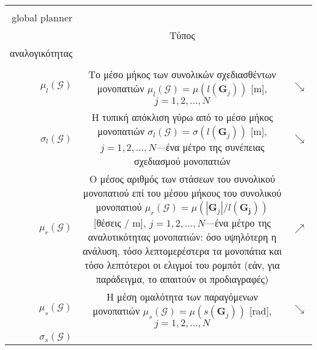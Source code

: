 \begin{table}[h]\hspace{-2.5cm}
  \renewcommand{\arraystretch}{1.8}
  \begin{tabular}{rcc}
    \begin{minipage} [t]{0.25\columnwidth}Μετρική αξιολόγησης \\ global planner \\ \end{minipage} & Τύπος & \begin{minipage} [t]{0.2\columnwidth}Τύπος \\ αναλογικότητας \\ \end{minipage} \\ \toprule
    $\mu_{l}(\bm{\mathcal{G}})$ &
    \begin{minipage}[t]{0.7\columnwidth}%
      Το μέσο μήκος των συνολικών σχεδιασθέντων μονοπατιών
      $\mu_l(\bm{\mathcal{G}}) = \mu(l(\bm{G}_j))$ [m], $j = 1,2,\dots,N$
    \end{minipage} & $\searrow$ \\
    $\sigma_{l}(\bm{\mathcal{G}})$ &
    \begin{minipage}[t]{0.7\columnwidth}%
      Η τυπική απόκλιση γύρω από το μέσο μήκος μονοπατιών
      $\sigma_l(\bm{\mathcal{G}}) = \sigma(l(\bm{G}_j))$ [m],
      $j = 1,2,\dots,N$---ένα μέτρο της συνέπειας σχεδιασμού μονοπατιών
    \end{minipage} & $\searrow$ \\
    $\mu_r(\bm{\mathcal{G}})$ &
    \begin{minipage}[t]{0.7\columnwidth}%
      Ο μέσος αριθμός των στάσεων του συνολικού μονοπατιού επί του μέσου μήκους
      του συνολικού μονοπατιού
      $\mu_r(\bm{\mathcal{G}}) = \mu(|\bm{G}_j| / l(\bm{\bm{G}_j}))$
      [θέσεις / m], $j = 1,2,\dots,N$---ένα μέτρο της αναλυτικότητας μονοπατιών:
      όσο υψηλότερη η ανάλυση, τόσο λεπτομερέστερα τα μονοπάτια και τόσο
      λεπτότεροι οι ελιγμοί του ρομπότ (εάν, για παράδειγμα, το απαιτούν οι
      προδιαγραφές)
    \end{minipage} & $\nearrow$ \\
    $\mu_{s}(\bm{\mathcal{G}})$ &
    \begin{minipage}[t]{0.7\columnwidth}%
      Η μέση ομαλότητα των παραγόμενων μονοπατιών
      $\mu_s(\bm{\mathcal{G}}) = \mu(s(\bm{G}_j))$ [rad], $j = 1,2,\dots,N$
    \end{minipage} &
    $\searrow$ \\
    $\sigma_{s}(\bm{\mathcal{G}})$ &

\end{tabular}
\end{table}
